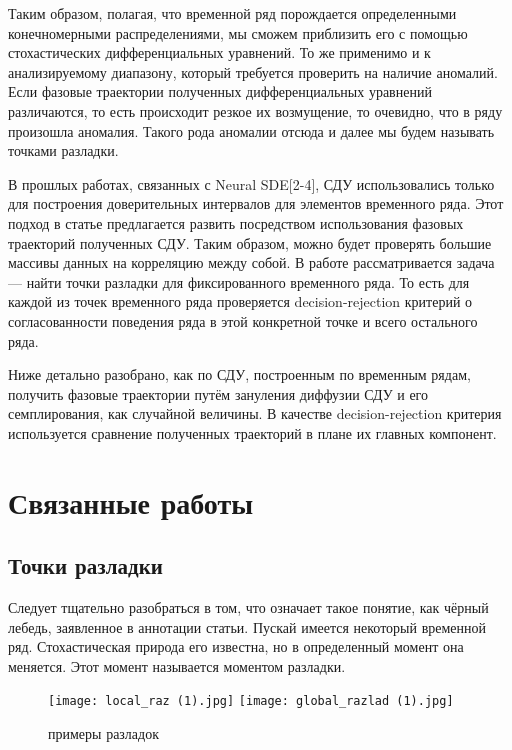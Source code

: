 \documentclass{article}
\begin{document}
   \par Таким образом, полагая, что временной ряд порождается определенными конечномерными распределениями, мы сможем приблизить его с помощью стохастических дифференциальных уравнений. То же применимо и к анализируемому диапазону, который требуется проверить на наличие аномалий. Если фазовые траектории полученных дифференциальных уравнений различаются, то есть происходит резкое их возмущение, то очевидно, что в ряду произошла аномалия. Такого рода аномалии отсюда и далее мы будем называть точками разладки.
   \par В прошлых работах, связанных с Neural SDE[2-4], СДУ использовались только для построения доверительных интервалов для элементов временного ряда. Этот подход в статье предлагается развить посредством использования фазовых траекторий полученных СДУ. Таким образом, можно будет проверять большие массивы данных на корреляцию между собой. В работе рассматривается задача --- найти точки разладки для фиксированного временного ряда. То есть для каждой из точек временного ряда проверяется decision-rejection критерий о согласованности поведения ряда в этой конкретной точке и всего остального ряда.
   \par Ниже детально разобрано, как по СДУ, построенным по временным рядам, получить фазовые траектории путём зануления диффузии СДУ и его семплирования, как случайной величины. В качестве decision-rejection критерия используется сравнение полученных траекторий в плане их главных компонент.

\section{Связанные работы}
  \subsection{Точки разладки}
    \par Следует тщательно разобраться в том, что означает такое понятие, как чёрный лебедь, заявленное в аннотации статьи. Пускай имеется некоторый временной ряд. Стохастическая природа его известна, но в определенный момент она меняется. Этот момент называется моментом разладки.


    \begin{figure}[htp]
    \centering
    \texttt{[image: local\_raz (1).jpg]}
    \texttt{[image: global\_razlad (1).jpg]}
    \caption{примеры разладок}
    \label{fig:galaxy}
    \end{figure}
\end{document}
